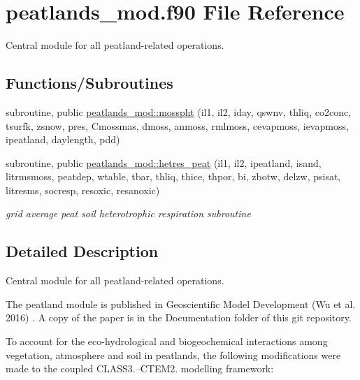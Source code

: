 \hypertarget{peatlands__mod_8f90}{}\section{peatlands\+\_\+mod.\+f90 File Reference}
\label{peatlands__mod_8f90}


Central module for all peatland-\/related operations.  


\subsection*{Functions/\+Subroutines}
{\bf }\par
\begin{DoxyCompactItemize}
\item 
subroutine, public \hyperlink{group__moss__photosynthesis_ga74c6ae528153d57336622db389f4bdd3}{peatlands\+\_\+mod\+::mosspht} (il1, il2, iday, qswnv, thliq, co2conc, tsurfk, zsnow, pres, Cmossmas, dmoss, anmoss, rmlmoss, cevapmoss, ievapmoss, ipeatland, daylength, pdd)
\end{DoxyCompactItemize}

{\bf }\par
\begin{DoxyCompactItemize}
\item 
subroutine, public \hyperlink{group__peat__soil__het__resp_gaed12b76ec8925a4bc3105f8ae7a36888}{peatlands\+\_\+mod\+::hetres\+\_\+peat} (il1, il2, ipeatland, isand, litrmsmoss, peatdep, wtable, tbar, thliq, thice, thpor, bi, zbotw, delzw, psisat, litresms, socresp, resoxic, resanoxic)
\begin{DoxyCompactList}\small\item\em grid average peat soil heterotrophic respiration subroutine \end{DoxyCompactList}\end{DoxyCompactItemize}



\subsection{Detailed Description}
Central module for all peatland-\/related operations. 

The peatland module is published in Geoscientific Model Development (Wu et al. 2016) \cite{Wu2016-zt}. A copy of the paper is in the Documentation folder of this git repository. 

 To account for the eco-\/hydrological and biogeochemical interactions among vegetation, atmosphere and soil in peatlands, the following modifications were made to the coupled C\+L\+A\+S\+S3.--C\+T\+E\+M2. modelling framework\+:


